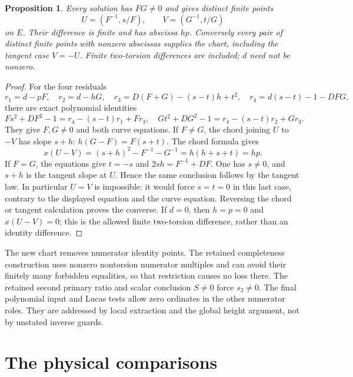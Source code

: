 \documentclass[11pt,a4paper]{article}
\newtheorem{proposition}{Proposition}
\begin{document}
\begin{proposition}
Every solution has $FG\ne0$ and gives distinct finite points
\[
                 U=(F^{-1},s/F),\qquad V=(G^{-1},t/G)
\]
on $E$. Their difference is finite and has abscissa $hp$.
Conversely every pair of distinct finite points with nonzero abscissas
supplies the chart, including the tangent case $V=-U$.
Finite two-torsion differences are included; $d$ need not be nonzero.
\end{proposition}
\begin{proof}
For the four residuals
\[
 r_1=d-pF,\quad r_2=d-hG,\quad
 r_3=D(F+G)-(s-t)h+t^2,\quad r_4=d(s-t)-1-DFG,
\]
there are exact polynomial identities
\[
 Fs^2+DF^2-1=r_4-(s-t)r_1+Fr_3,
\quad
 Gt^2+DG^2-1=r_4-(s-t)r_2+Gr_3.
\]
They give $F,G\ne0$ and both curve equations.
If $F\ne G$, the chord joining $U$ to $-V$ has slope $s+h$:
$h(G-F)=F(s+t)$. The chord formula gives
\[
 x(U-V)=(s+h)^2-F^{-1}-G^{-1}=h(h+s+t)=hp.
\]
If $F=G$, the equations give $t=-s$ and
$2sh=F^{-1}+DF$. One has $s\ne0$, and $s+h$ is the tangent slope
at $U$. Hence the same conclusion follows by the tangent law.
In particular $U=V$ is impossible: it would force $s=t=0$ in this
last case, contrary to the displayed equation and the curve equation.
Reversing the chord or tangent calculation proves the converse.
If $d=0$, then $h=p=0$ and $x(U-V)=0$; this is the allowed finite
two-torsion difference, rather than an identity difference.
\end{proof}

The new chart removes numerator identity points. The retained
completeness construction uses nonzero nontorsion numerator multiples
and can avoid their finitely many forbidden equalities, so that
restriction causes no loss there. The retained second primary ratio
and scalar conclusion $S\ne0$ force $s_2\ne0$. The final polynomial
input and Lucas tests allow zero ordinates in the other numerator roles.
They are addressed by local extraction and the global height argument,
not by unstated inverse guards.

\section{The physical comparisons}
\end{document}
